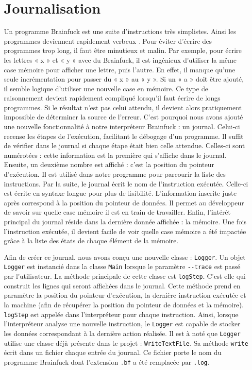 \documentclass{article}
\begin{document}
\section{Journalisation}
    Un programme Brainfuck est une suite d’instructions très simplistes. Ainsi les programmes deviennent rapidement verbeux . Pour éviter d’écrire des programmes trop long, il faut être minutieux et malin. Par exemple, pour écrire les lettres « x » et « y » avec du Brainfuck, il est ingénieux d’utiliser la même case mémoire pour afficher une lettre, puis l’autre. En effet, il manque qu’une seule incrémentation pour passer du « x » au « y ». Si un « a » doit être ajouté, il semble logique d’utiliser une nouvelle case en mémoire. Ce type de raisonnement devient rapidement compliqué lorsqu’il faut écrire de longs programmes. Si le résultat n’est pas celui attendu, il devient alors pratiquement impossible de déterminer la source de l’erreur. C’est pourquoi nous avons ajouté une nouvelle fonctionnalité à notre interpréteur Brainfuck : un journal. Celui-ci recense les étapes de l’exécution, facilitant le débogage d'un programme. Il suffit de vérifier dans le journal si chaque étape était bien celle attendue. Celles-ci sont numérotées : cette information est la première qui s’affiche dans le journal. Ensuite, un deuxième nombre est affiché : c’est la position du pointeur d’exécution. Il est utilisé dans notre programme pour parcourir la liste des instructions. Par la suite, le journal écrit le nom de l’instruction exécutée. Celle-ci est écrite en syntaxe longue pour plus de lisibilité. L’information inscrite juste après correspond à la position du pointeur de données. Il permet au développeur de savoir sur quelle case mémoire il est en train de travailler. Enfin, l’intérêt principal du journal réside dans la dernière donnée affichée : la mémoire. Une fois l’instruction exécutée, il devient facile de voir quelle case mémoire a été impactée grâce à la liste des états de chaque élément de la mémoire.

    Afin de créer ce journal, nous avons conçu une nouvelle classe : \texttt{Logger}. Un objet \texttt{Logger} est instancié dans la classe \texttt{Main} lorsque le paramètre \texttt{-{}-trace} est passé par l’utilisateur. La méthode principale de cette classe est \texttt{logStep}. C’est elle qui construit les lignes qui seront affichées dans le journal. Cette méthode prend en paramètre la position du pointeur d’exécution, la dernière instruction exécutée et la machine (afin de récupérer la position du pointeur de données et la mémoire). \texttt{logStep} est appelée dans l’interpréteur pour chaque instruction. Ainsi, lorsque l’interpréteur analyse une nouvelle instruction, le \texttt{Logger} est capable de stocker les données correspondant à la dernière action réalisée. Il est à noté que \texttt{Logger} utilise une classe déjà présente dans le projet : \texttt{WriteTextFile}. Sa méthode \texttt{write} écrit dans un fichier chaque entrée du journal. Ce fichier porte le nom du programme Brainfuck dont l'extension \texttt{.bf} a été remplacée par \texttt{.log}.
\end{document}
